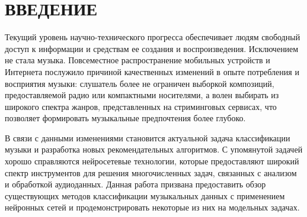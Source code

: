 \chapter*{\large ВВЕДЕНИЕ}  
Текущий уровень научно-технического прогресса обеспечивает 
людям свободный
доступ к информации и средствам ее создания и воспроизведения. Исключением не
стала музыка. Повсеместное распространение мобильных устройств и 
Интернета послужило причиной качественных изменений в опыте потребления и
восприятия музыки: слушатель более не ограничен выборкой композиций, предоставляемой
радио или компактными носителями, а волен выбирать из широкого спектра жанров,
представленных на стриминговых сервисах, что позволяет формировать музыкальные
предпочтения более глубоко.

В связи с данными изменениями становится актуальной задача
классификации музыки и разработка новых рекомендательных
алгоритмов. С упомянутой задачей хорошо справляются нейросетевые
технологии, которые предоставляют широкий спектр инструментов
для решения многочисленных задач, связанных с анализом и обработкой
аудиоданных. Данная работа призвана предоставить обзор
существующих методов классификации музыкальных данных с применением
нейронных сетей и продемонстрировать некоторые из них на
модельных задачах.

